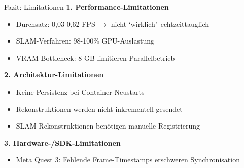 \begin{frame}{Fazit: Limitationen}
    \textbf{1. Performance-Limitationen}
    \begin{itemize}
        \itemsep0.4em
        \item Durchsatz: 0,03-0,62 FPS $\rightarrow$ nicht \lq wirklich\rq ~echtzeittauglich
        \item SLAM-Verfahren: 98-100\% GPU-Auslastung
        \item VRAM-Bottleneck: 8 GB limitieren Parallelbetrieb
    \end{itemize}
    
    \vfill
    
    \textbf{2. Architektur-Limitationen}
    \begin{itemize}
        \itemsep0.4em
        \item Keine Persistenz bei Container-Neustarts
        \item Rekonstruktionen werden nicht inkrementell gesendet
        \item SLAM-Rekonstruktionen benötigen manuelle Registrierung
    \end{itemize}
    
    \vfill
    
    \textbf{3. Hardware-/SDK-Limitationen}
    \begin{itemize}
        \itemsep0.3em
        \item Meta Quest 3: Fehlende Frame-Timestamps erschweren Synchronisation
    \end{itemize}
\end{frame}

